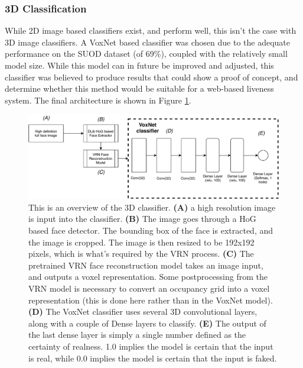 \documentclass[11pt,a4paper]{article}
\begin{document}
        \subsubsection{3D Classification}
            While 2D image based classifiers exist, and perform well, this isn't the case with 3D image classifiers. A VoxNet based classifier was chosen due to the adequate performance on the SUOD dataset (of 69\%),
            coupled with the relatively small model size. \cite{VoxNetModel} While this model can in future be improved and adjusted, this classifier was believed to produce results that could show a proof of concept,
            and determine whether this method would be suitable for a web-based liveness system. The final architecture is shown in Figure \ref{3DClassifierArchitectureDiagram}.

            \begin{figure}
                \centering
                \includegraphics[width=\linewidth]{voxnet.pdf}
                \caption{
                    This is an overview of the 3D classifier. \textbf{(A)} a high resolution image is input into the classifier. \textbf{(B)} The image goes through a HoG based face detector. The bounding box of the face is extracted, and the image is cropped. 
                    The image is then resized to be 192x192 pixels, which is what's required by the VRN process.
                    \textbf{(C)} The pretrained VRN face reconstruction model takes an image input, and outputs a voxel representation. Some postprocessing from the VRN model 
                    is necessary to convert an occupancy grid into a voxel representation (this is done here rather than in the VoxNet model).
                    \textbf{(D)} The VoxNet classifier uses several 3D convolutional layers, along with a couple of Dense layers to classify.
                    \textbf{(E)} The output of the last dense layer is simply a single number defined as the certainty of realness. 1.0 implies the model is certain that the input is real, while 0.0 implies the model is certain that the input is faked.
                }
                \label{3DClassifierArchitectureDiagram}
            \end{figure}
\end{document}
